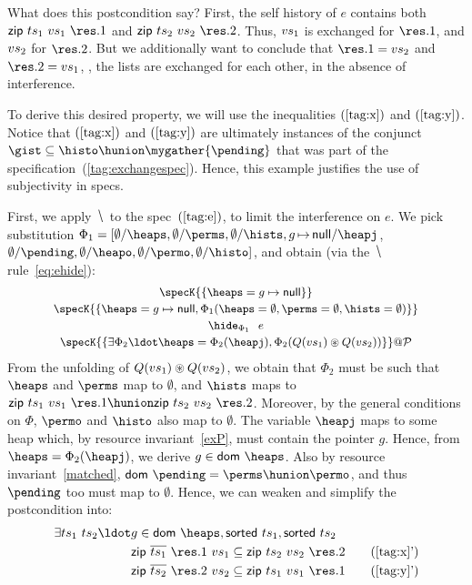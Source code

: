 What does this postcondition say? First, the self history of $e$
contains both $\mathsf{zip}~\ts_1~\vvs_1~\res.1$ and
$\mathsf{zip}~\ts_2~\vvs_2~\res.2$. Thus, ${vs}_1$ is exchanged for
$\res.1$, and ${vs}_2$ for $\res.2$. But we additionally want to
conclude that $\res.1 = \vvs_2$ and $\res.2 = \vvs_1$, \ie, the lists
are exchanged for each other, in the absence of interference.

To derive this desired property, we will use the inequalities
$(\ref{tag:x})$ and $(\ref{tag:y})$. Notice that $(\ref{tag:x})$ and
$(\ref{tag:y})$ are ultimately instances of the conjunct
$\gist \subseteq \histo \hunion \mygather{\pending}$ that was part of
the specification~(\ref{tag:exchangespec}). Hence, this example
justifies the use of subjectivity in specs.

First, we apply $\hide$ to the spec~$(\ref{tag:e})$, to limit the
interference on $e$. We pick substitution
$\Phi_1 = [\emptyset/\heaps, \emptyset/\perms, \emptyset/\hists,
g\,{\mapsto}\,\mathsf{null}/\heapj$,
$\emptyset/\pending, \emptyset/\heapo, \emptyset/\permo,
\emptyset/\histo]$,
and obtain (via the $\hide$ rule~\eqref{eq:ehide}):
%
\[
{\small{
\begin{array}{c}
\specK{\{\heaps = g \mapsto \mathsf{null}\}}\\[2pt]
\specK{\{\heaps = g \mapsto \mathsf{null}, \Phi_1 (\heaps = \emptyset, \perms = \emptyset, \hists = \emptyset)\}}\\[2pt]
\hide_{\Phi_1}~~e \\[2pt]
\specK{\{\exists \Phi_2\ldot \heaps = \Phi_2(\heapj), \Phi_2(Q (\vvs_1) \circledast Q(\vvs_2))\}} @ \cal P
\end{array}
}}
\]
%
From the unfolding of $Q({vs}_1) \circledast Q({vs}_2)$, we obtain
that $\Phi_2$ must be such that $\heaps$ and $\perms$ map to
$\emptyset$, and $\hists$ maps to $\mathsf{zip}~\ts_1~\vvs_1~\res.1
\hunion \mathsf{zip}~\ts_2~\vvs_2~\res.2$. Moreover, by the general
conditions on $\Phi$, $\permo$ and $\histo$ also map to
$\emptyset$. The variable $\heapj$ maps to some heap which, by
resource invariant~\ref{exP}, must contain the pointer $g$. Hence,
from $\heaps = \Phi_2(\heapj)$, we derive $g \in
\mathsf{dom}~\heaps$. Also by resource invariant~\ref{matched},
$\mathsf{dom}\ \pending = \perms \hunion \permo$, and thus $\pending$
too must map to $\emptyset$. Hence, we can weaken and simplify the
postcondition into:
\begin{align*}
\exists \ts_1~\ts_2\ldot & g \in \mathsf{dom}\ \heaps, \sorted{\ts_1}, \sorted{\ts_2}\\
& \mathsf{zip}~\overline{\ts_1}~\res.1~\vvs_1 \subseteq \mathsf{zip}~\ts_2~\vvs_2~\res.2 \tag{\ref{tag:x}'}\label{tag:x'}\\
& \mathsf{zip}~\overline{\ts_2}~\res.2~\vvs_2 \subseteq \mathsf{zip}~\ts_1~\vvs_1~\res.1 \tag{\ref{tag:y}'}\label{tag:y'}
\end{align*}
